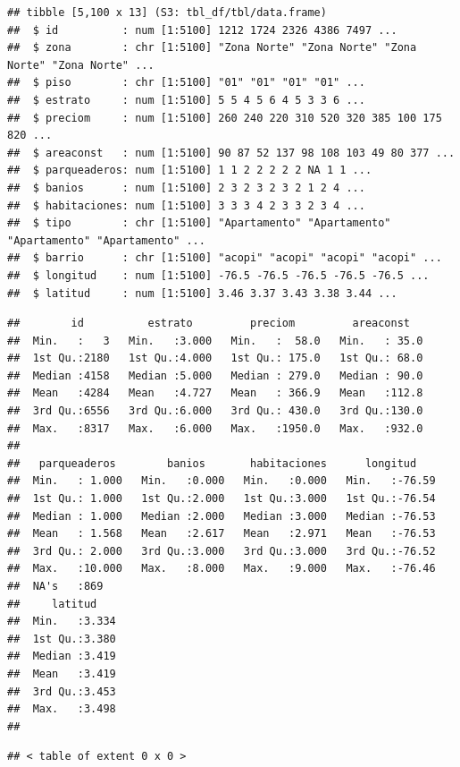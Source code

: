 \documentclass[
]{article}
\begin{document}
\begin{verbatim}
## tibble [5,100 x 13] (S3: tbl_df/tbl/data.frame)
##  $ id          : num [1:5100] 1212 1724 2326 4386 7497 ...
##  $ zona        : chr [1:5100] "Zona Norte" "Zona Norte" "Zona Norte" "Zona Norte" ...
##  $ piso        : chr [1:5100] "01" "01" "01" "01" ...
##  $ estrato     : num [1:5100] 5 5 4 5 6 4 5 3 3 6 ...
##  $ preciom     : num [1:5100] 260 240 220 310 520 320 385 100 175 820 ...
##  $ areaconst   : num [1:5100] 90 87 52 137 98 108 103 49 80 377 ...
##  $ parqueaderos: num [1:5100] 1 1 2 2 2 2 2 NA 1 1 ...
##  $ banios      : num [1:5100] 2 3 2 3 2 3 2 1 2 4 ...
##  $ habitaciones: num [1:5100] 3 3 3 4 2 3 3 2 3 4 ...
##  $ tipo        : chr [1:5100] "Apartamento" "Apartamento" "Apartamento" "Apartamento" ...
##  $ barrio      : chr [1:5100] "acopi" "acopi" "acopi" "acopi" ...
##  $ longitud    : num [1:5100] -76.5 -76.5 -76.5 -76.5 -76.5 ...
##  $ latitud     : num [1:5100] 3.46 3.37 3.43 3.38 3.44 ...
\end{verbatim}

\begin{verbatim}
##        id          estrato         preciom         areaconst    
##  Min.   :   3   Min.   :3.000   Min.   :  58.0   Min.   : 35.0  
##  1st Qu.:2180   1st Qu.:4.000   1st Qu.: 175.0   1st Qu.: 68.0  
##  Median :4158   Median :5.000   Median : 279.0   Median : 90.0  
##  Mean   :4284   Mean   :4.727   Mean   : 366.9   Mean   :112.8  
##  3rd Qu.:6556   3rd Qu.:6.000   3rd Qu.: 430.0   3rd Qu.:130.0  
##  Max.   :8317   Max.   :6.000   Max.   :1950.0   Max.   :932.0  
##                                                                 
##   parqueaderos        banios       habitaciones      longitud     
##  Min.   : 1.000   Min.   :0.000   Min.   :0.000   Min.   :-76.59  
##  1st Qu.: 1.000   1st Qu.:2.000   1st Qu.:3.000   1st Qu.:-76.54  
##  Median : 1.000   Median :2.000   Median :3.000   Median :-76.53  
##  Mean   : 1.568   Mean   :2.617   Mean   :2.971   Mean   :-76.53  
##  3rd Qu.: 2.000   3rd Qu.:3.000   3rd Qu.:3.000   3rd Qu.:-76.52  
##  Max.   :10.000   Max.   :8.000   Max.   :9.000   Max.   :-76.46  
##  NA's   :869                                                      
##     latitud     
##  Min.   :3.334  
##  1st Qu.:3.380  
##  Median :3.419  
##  Mean   :3.419  
##  3rd Qu.:3.453  
##  Max.   :3.498  
## 
\end{verbatim}

\begin{verbatim}
## < table of extent 0 x 0 >
\end{verbatim}
\end{document}
